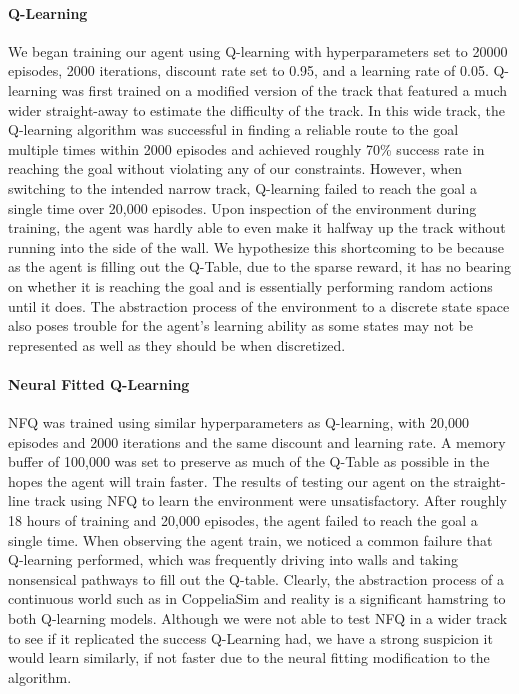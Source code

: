 \documentclass{article}
\begin{document}
\paragraph{Q-Learning}
We began training our agent using Q-learning with hyperparameters set to 20000 episodes, 2000 iterations, discount rate set to 0.95, and a learning rate of 0.05. Q-learning was first trained on a modified version of the track that featured a much wider straight-away to estimate the difficulty of the track. In this wide track, the Q-learning algorithm was successful in finding a reliable route to the goal multiple times within 2000 episodes and achieved roughly 70\% success rate in reaching the goal without violating any of our constraints. However, when switching to the intended narrow track, Q-learning failed to reach the goal a single time over 20,000 episodes. Upon inspection of the environment during training, the agent was hardly able to even make it halfway up the track without running into the side of the wall. We hypothesize this shortcoming to be because as the agent is filling out the Q-Table, due to the sparse reward, it has no bearing on whether it is reaching the goal and is essentially performing random actions until it does. The abstraction process of the environment to a discrete state space also poses trouble for the agent's learning ability as some states may not be represented as well as they should be when discretized.
\paragraph{Neural Fitted Q-Learning}
NFQ was trained using similar hyperparameters as Q-learning, with 20,000 episodes and 2000 iterations and the same discount and learning rate. A memory buffer of 100,000 was set to preserve as much of the Q-Table as possible in the hopes the agent will train faster. The results of testing our agent on the straight-line track using NFQ to learn the environment were unsatisfactory. After roughly 18 hours of training and 20,000 episodes, the agent failed to reach the goal a single time. When observing the agent train, we noticed a common failure that Q-learning performed, which was frequently driving into walls and taking nonsensical pathways to fill out the Q-table. Clearly, the abstraction process of a continuous world such as in CoppeliaSim and reality is a significant hamstring to both Q-learning models. Although we were not able to test NFQ in a wider track to see if it replicated the success Q-Learning had, we have a strong suspicion it would learn similarly, if not faster due to the neural fitting modification to the algorithm.
\end{document}

